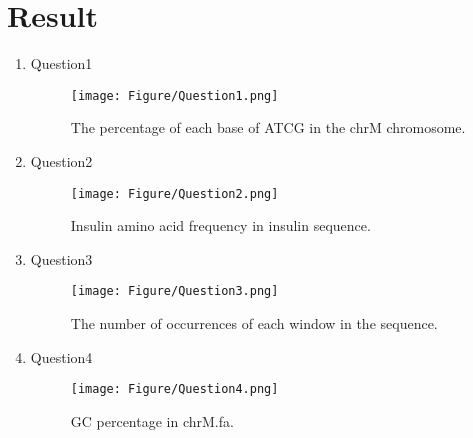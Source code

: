 \documentclass[a4paper]{article}
\begin{document}
    \section{Result}
        \begin{enumerate}
        \item Question1
            \begin{figure}[H]
            \centering
            \texttt{[image: Figure/Question1.png]}
            \caption{The percentage of each base of ATCG in the chrM chromosome.}
            \end{figure}

        \item Question2
            \begin{figure}[H]
            \centering
            \texttt{[image: Figure/Question2.png]}
            \caption{Insulin amino acid frequency in insulin sequence.}
            \end{figure}
          
        \item Question3
            \begin{figure}[H]
            \centering
            \texttt{[image: Figure/Question3.png]}
            \caption{The number of occurrences of each window in the sequence.}
            \end{figure}
                    
        \item Question4
            \begin{figure}[H]
            \centering
            \texttt{[image: Figure/Question4.png]}
            \caption{GC percentage in chrM.fa.}
            \end{figure}
         
        \end{enumerate}
    
\end{document}
